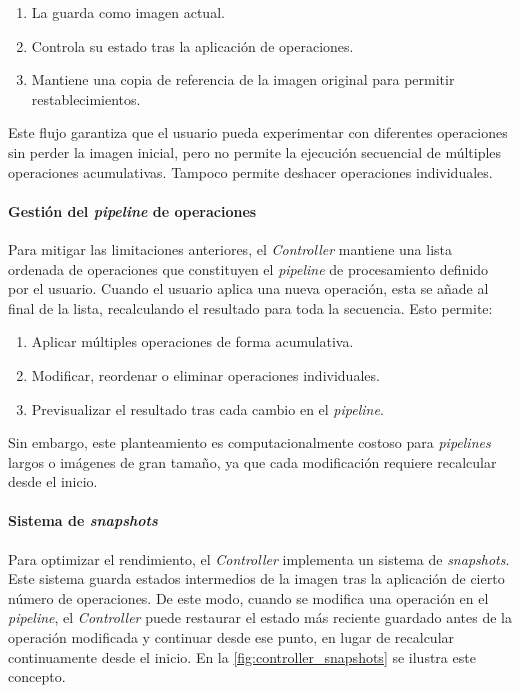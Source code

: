 \begin{enumerate}[noitemsep]
    \item La guarda como imagen actual.
    \item Controla su estado tras la aplicación de operaciones.
    \item Mantiene una copia de referencia de la imagen original para permitir restablecimientos.
\end{enumerate}

Este flujo garantiza que el usuario pueda experimentar con diferentes operaciones sin perder 
la imagen inicial, pero no permite la ejecución secuencial de múltiples operaciones acumulativas. Tampoco 
permite deshacer operaciones individuales.

\paragraph{Gestión del \textit{pipeline} de operaciones} \label{par:7_3_4_2_gestion_pipeline_operaciones}
Para mitigar las limitaciones anteriores, el \textit{Controller} mantiene una lista ordenada de
operaciones que constituyen el \textit{pipeline} de procesamiento definido por el usuario. 
Cuando el usuario aplica una nueva operación, esta se añade al final de la lista, recalculando 
el resultado para toda la secuencia. Esto permite:

\begin{enumerate}[noitemsep]
    \item Aplicar múltiples operaciones de forma acumulativa.
    \item Modificar, reordenar o eliminar operaciones individuales.
    \item Previsualizar el resultado tras cada cambio en el \textit{pipeline}.
\end{enumerate}

Sin embargo, este planteamiento es computacionalmente costoso para \textit{pipelines} largos 
o imágenes de gran tamaño, ya que cada modificación requiere recalcular desde el inicio.

\newpage

\paragraph{Sistema de \textit{snapshots}} \label{par:7_3_4_3_sistema_snapshots}
Para optimizar el rendimiento, el \textit{Controller} implementa un sistema de \textit{snapshots}. Este sistema
guarda estados intermedios de la imagen tras la aplicación de cierto número de operaciones. De este modo,
cuando se modifica una operación en el \textit{pipeline}, el \textit{Controller} puede restaurar el estado 
más reciente guardado antes de la operación modificada y continuar desde ese punto, en lugar de recalcular 
continuamente desde el inicio. En la \autoref{fig:controller_snapshots} se ilustra este concepto.

